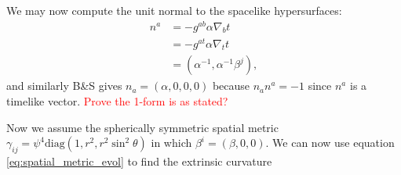 \documentclass[12pt]{article}
\numberwithin{equation}{section}
\newcommand{\redtext}[1]{\textcolor{red}{#1}}
\begin{document}
We may now compute the unit normal to the spacelike hypersurfaces:
\begin{equation}
\begin{aligned}
n^a &= -g^{ab} \alpha \nabla_b t \\
&= -g^{a t} \alpha \nabla_t t \\
&= (\alpha^{-1}, \alpha^{-1} \beta^{j}),
\end{aligned}
\end{equation}
and similarly B\&S gives $n_a = (\alpha, 0, 0, 0)$ because $n_a n^a = -1$ since $n^a$ is a timelike vector. \redtext{Prove the 1-form is as stated?}

Now we assume the spherically symmetric spatial metric $\gamma_{ij} = \psi^4 \mathrm{diag}(1, r^2, r^2 \sin^2 \theta)$ in which $\beta^i = (\beta, 0, 0)$.  We can now use equation \ref{eq:spatial_metric_evol} to find the extrinsic curvature
\end{document}

